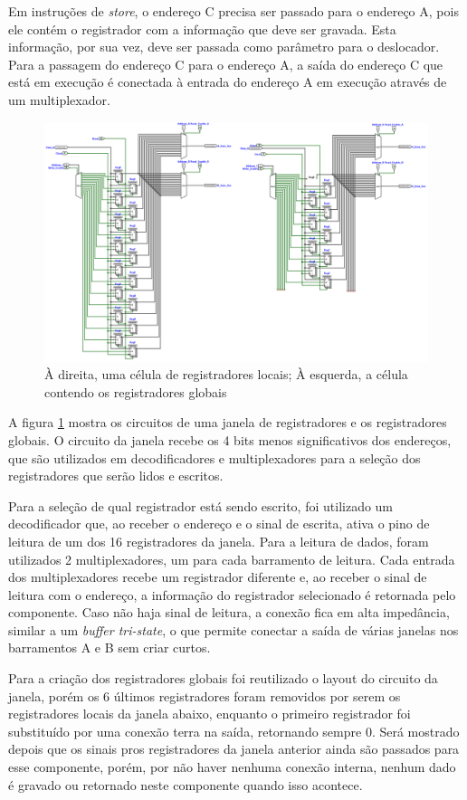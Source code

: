 \documentclass[
	article,			%
	11pt,				%
	oneside,			%
	a4paper,			%
	english,			%
	brazil,				%
	sumario=tradicional
	]{abntex2}
\begin{document}
Em instruções de \textit{store}, o endereço C precisa ser passado para o endereço A, pois ele contém o registrador com a informação que deve ser gravada. Esta informação, por sua vez, deve ser passada como parâmetro para o deslocador. Para a passagem do endereço C para o endereço A, a saída do endereço C que está em execução é conectada à entrada do endereço A em execução através de um multiplexador.
\begin{figure}[H]
    \centering
    \includegraphics[width=0.75\linewidth]{Logisim/windowCells.png}
    \caption{À direita, uma célula de registradores locais; À esquerda, a célula contendo os registradores globais}
    \label{fig:windowCells}
\end{figure}
A figura \ref{fig:windowCells} mostra os circuitos de uma janela de registradores e os registradores globais. O circuito da janela recebe os 4 bits menos significativos dos endereços, que são utilizados em decodificadores e multiplexadores para a seleção dos registradores que serão lidos e escritos.

Para a seleção de qual registrador está sendo escrito, foi utilizado um decodificador que, ao receber o endereço e o sinal de escrita, ativa o pino de leitura de um dos 16 registradores da janela. Para a leitura de dados, foram utilizados 2 multiplexadores, um para cada barramento de leitura. Cada entrada dos multiplexadores recebe um registrador diferente e, ao receber o sinal de leitura com o endereço, a informação do registrador selecionado é retornada pelo componente. Caso não haja sinal de leitura, a conexão fica em alta impedância, similar a um \textit{buffer tri-state}, o que permite conectar a saída de várias janelas nos barramentos A e B sem criar curtos.

Para a criação dos registradores globais foi reutilizado o layout do circuito da janela, porém os 6 últimos registradores foram removidos por serem os registradores locais da janela abaixo, enquanto o primeiro registrador foi substituído por uma conexão terra na saída, retornando sempre 0. Será mostrado depois que os sinais pros registradores da janela anterior ainda são passados para esse componente, porém, por não haver nenhuma conexão interna, nenhum dado é gravado ou retornado neste componente quando isso acontece.
\end{document}
